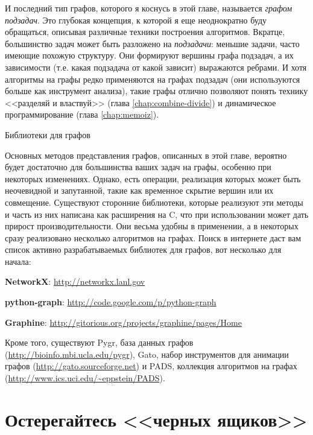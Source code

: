 И последний тип графов, которого я коснусь в этой главе, называется \textit{графом подзадач}. Это глубокая концепция, к которой я еще неоднократно буду обращаться, описывая различные техники построения алгоритмов. Вкратце, большинство задач может быть разложено на \textit{подзадачи}: меньшие задачи, часто имеющие похожую структуру. Они формируют вершины графа подзадач, а их зависимости (т.е. какая подзадача от какой зависит) выражаются ребрами. И хотя алгоритмы на графы редко применяются на графах подзадач (они используются больше как инструмент анализа), такие графы отлично позволяют понять технику <<разделяй и властвуй>> (глава \ref{chap:combine-divide}) и динамическое программирование (глава \ref{chap:memoiz}).

\begin{notice}{Библиотеки для графов}

Основных методов представления графов, описанных в этой главе, вероятно будет достаточно для большинства ваших задач на графы, особенно при некоторых изменениях. Однако, есть операции, реализация которых может быть неочевидной и запутанной, такие как временное скрытие вершин или их совмещение. Существуют сторонние библиотеки, которые реализуют эти методы и часть из них написана как расширения на C, что при использовании может дать прирост производительности. Они весьма удобны в применении, а в некоторых сразу реализовано несколько алгоритмов на графах. Поиск в интернете даст вам список активно разрабатываемых библиотек для графов, вот несколько для начала:
\begin{itemize*}
\item {\bf NetworkX}: \url{http://networkx.lanl.gov}
\item {\bf python-graph}: \url{http://code.google.com/p/python-graph}
\item {\bf Graphine}: \url{http://gitorious.org/projects/graphine/pages/Home}
\end{itemize*}

Кроме того, существуют Pygr, база данных графов (\url{http://bioinfo.mbi.ucla.edu/pygr}), Gato, набор инструментов для анимации графов (\url{http://gato.sourceforge.net}) и PADS, коллекция алгоритмов на графах (\url{http://www.ics.uci.edu/~eppstein/PADS}).
\end{notice}

\section{Остерегайтесь <<черных ящиков>>}

